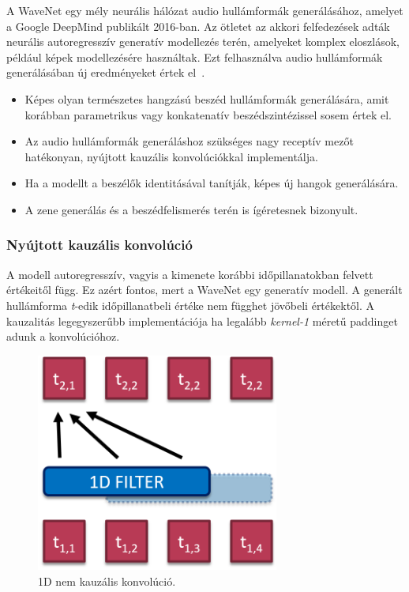 A WaveNet egy mély neurális hálózat audio hullámformák generálásához, amelyet a Google DeepMind publikált 2016-ban. Az ötletet az akkori felfedezések adták neurális autoregresszív generatív modellezés terén, amelyeket komplex eloszlások, például képek modellezésére használtak. Ezt felhasználva audio hullámformák generálásában új eredményeket értek el~\cite{wavenet}.

\begin{itemize}
	\item Képes olyan természetes hangzású beszéd hullámformák generálására, amit korábban parametrikus vagy konkatenatív beszédszintézissel sosem értek el. 
	\item Az audio hullámformák generáláshoz szükséges nagy receptív mezőt hatékonyan, nyújtott kauzális konvolúciókkal implementálja.
	\item Ha a modellt a beszélők identitásával tanítják, képes új hangok generálására.
	\item A zene generálás és a beszédfelismerés terén is ígéretesnek bizonyult.
\end{itemize}

\subsubsection{Nyújtott kauzális konvolúció}

A modell autoregresszív, vagyis a kimenete korábbi időpillanatokban felvett értékeitől függ. Ez azért fontos, mert a WaveNet egy generatív modell. A generált hullámforma \emph{t}-edik időpillanatbeli értéke nem függhet jövőbeli értékektől. A kauzalitás legegyszerűbb implementációja ha legalább \emph{kernel-1} méretű paddinget adunk a konvolúcióhoz.

\begin{figure}[!ht]
	\centering
	\includegraphics[width=80mm, keepaspectratio]{figures/1d-conv.png}
	\caption{1D nem kauzális konvolúció.}
	\label{fig:1d_noncausal_conv}
\end{figure}

